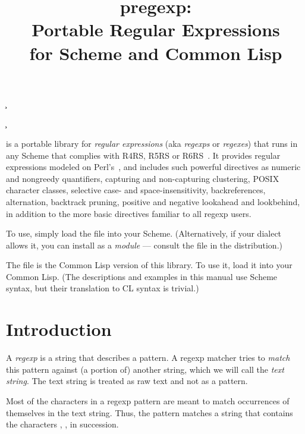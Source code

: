 

\title{pregexp: \\
Portable Regular Expressions \\
for Scheme and Common Lisp}

\ifx\shipout\UnDeFiNeD
\c{}
\fi

\c{}

\bigskip

\n {} is a portable library for {\em
regular expressions} (aka {\em regexps} or {\em
regexes}) that runs in any Scheme
that complies with R4RS, R5RS or R6RS~\cite{r6rs}.  It
provides regular expressions
modeled on
Perl's~\cite{friedl:regex,pperl}, and includes such
powerful directives as numeric and nongreedy
quantifiers, capturing and non-capturing clustering,
POSIX character classes, selective case- and
space-insensitivity, backreferences, alternation,
backtrack pruning,
positive and negative lookahead and lookbehind, in
addition to the more basic directives familiar to all
regexp users.

To use, simply load the file  into
your Scheme.
(Alternatively, if your dialect allows it, you can
install  as a {\em module} --- consult
the file
 in the distribution.)

The file  is the Common Lisp version
of this library.  To use it, load it into your Common Lisp.
(The descriptions and examples in this manual use Scheme
syntax, but their
translation to CL syntax is trivial.)

\htmlonly


\tableofcontents
\endhtmlonly

\section{Introduction}

A {\em regexp} is a string that describes a pattern.  A
regexp matcher tries to {\em match} this pattern
against (a portion of) another string, which we
will call the {\em text string}.  The text string
is treated as raw text and not as a pattern.

Most of the characters in a regexp pattern are meant to
match occurrences of themselves in the text string.
Thus, the pattern  matches a string that
contains the characters , ,  in succession.

